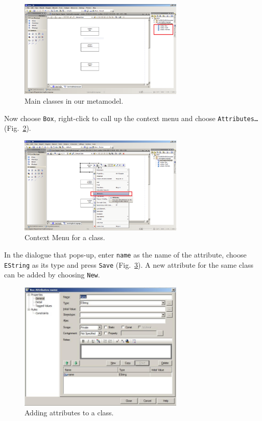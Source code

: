 \begin{figure}[htbp]
	\centering
  \includegraphics[width=0.7\textwidth]{pics/memBoxBilder/memBox10.png}
	\caption{Main classes in our metamodel.}
	\label{fig:all_eclasses}
\end{figure}

Now choose \texttt{Box}, right-click to call up the context menu and choose
\texttt{Att\-ri\-butes\ldots} (Fig.~\ref{fig:attribute}).

\begin{figure}[htbp]
	\centering
  \includegraphics[width=0.7\textwidth]{pics/memBoxBilder/memBox11.png}
	\caption{Context Menu for a class.}
	\label{fig:attribute}
\end{figure}


In the dialogue that pops-up, enter \texttt{name} as the name of the attribute,
choose \texttt{EString} as its type and press \texttt{Save}
(Fig.~\ref{fig:attribute_properties}).  A new attribute for the same class can
be added by choosing \texttt{New}.

\begin{figure}[htbp]
	\centering
  \includegraphics[width=0.7\textwidth]{pics/memBoxBilder/memBox13.png}
	\caption{Adding attributes to a class.}
	\label{fig:attribute_properties}
\end{figure} 

